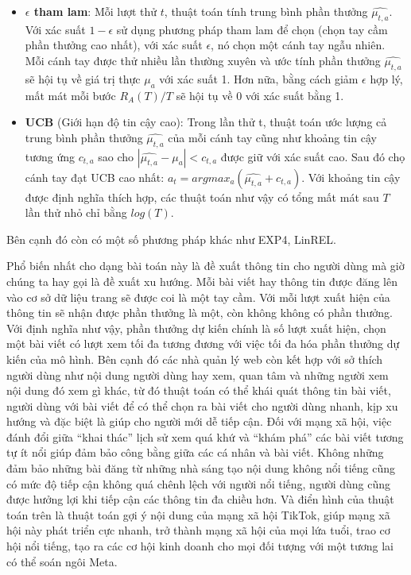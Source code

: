 \documentclass[14pt,oneside]{scrbook}
\providecommand{\tightlist}{\setlength{\itemsep}{\smallskipamount}\setlength{\parskip}{\smallskipamount}}
\begin{document}
\begin{itemize}
\tightlist
\item
  \textbf{\(\epsilon\) tham lam}: Mỗi lượt thử \(t\), thuật toán tính
  trung bình phần thưởng \(\hat{\mu_{t,a}}\). Với xác suất
  \(1-\epsilon\) sử dụng phương pháp tham lam để chọn (chọn tay cầm phần
  thưởng cao nhất), với xác suất \(\epsilon\), nó chọn một cánh tay ngẫu
  nhiên. Mỗi cánh tay được thử nhiều lần thường xuyên và ước tính phần
  thưởng \(\hat{\mu_{t,a}}\) sẽ hội tụ về giá trị thực \(\mu_a\) với xác
  suất 1. Hơn nữa, bằng cách giảm \(\epsilon\) hợp lý, mất mát mỗi bước
  \(R_A(T)/T\) sẽ hội tụ về 0 với xác suất bằng 1.
\item
  \textbf{UCB} (Giới hạn độ tin cậy cao): Trong lần thử t, thuật toán
  ước lượng cả trung bình phần thưởng \(\hat{\mu_{t,a}}\) của mỗi cánh
  tay cũng như khoảng tin cậy tương ứng \(c_{t,a}\) sao cho
  \(|\hat{\mu_{t,a}}-\mu_a|<c_{t,a}\) được giữ với xác suất cao. Sau đó
  chọ cánh tay đạt UCB cao nhất:
  \(a_t= argmax_a(\hat{\mu_{t,a}}+c_{t,a})\). Với khoảng tin cậy được
  định nghĩa thích hợp, các thuật toán như vậy có tổng mất mát sau \(T\)
  lần thử nhỏ chỉ bằng \(log(T)\).
\end{itemize}

Bên cạnh đó còn có một số phương pháp khác như EXP4, LinREL.

Phổ biến nhất cho dạng bài toán này là đề xuất thông tin cho người dùng
mà giờ chúng ta hay gọi là đề xuất xu hướng. Mỗi bài viết hay thông tin
được đăng lên vào cơ sở dữ liệu trang sẽ được coi là một tay cầm. Với
mỗi lượt xuất hiện của thông tin sẽ nhận được phần thưởng là một, còn
không không có phần thưởng. Với định nghĩa như vậy, phần thưởng dự kiến
chính là số lượt xuất hiện, chọn một bài viết có lượt xem tối đa tương
đương với việc tối đa hóa phần thưởng dự kiến của mô hình. Bên cạnh đó
các nhà quản lý web còn kết hợp với sở thích người dùng như nội dung
người dùng hay xem, quan tâm và những người xem nội dung đó xem gì khác,
từ đó thuật toán có thể khái quát thông tin bài viết, người dùng với bài
viết để có thể chọn ra bài viết cho người dùng nhanh, kịp xu hướng và
đặc biệt là giúp cho người mới dễ tiếp cận. Đối với mạng xã hội, việc
đánh đổi giữa ``khai thác'' lịch sử xem quá khứ và ``khám phá'' các bài
viết tương tự ít nổi giúp đảm bảo công bằng giữa các cá nhân và bài
viết. Không những đảm bảo những bài đăng từ những nhà sáng tạo nội dung
không nổi tiếng cũng có mức độ tiếp cận không quá chênh lệch với người
nổi tiếng, người dùng cũng được hưởng lợi khi tiếp cận các thông tin đa
chiều hơn. Và điển hình của thuật toán trên là thuật toán gợi ý nội dung
của mạng xã hội TikTok, giúp mạng xã hội này phát triển cực nhanh, trở
thành mạng xã hội của mọi lứa tuổi, trao cơ hội nổi tiếng, tạo ra các cơ
hội kinh doanh cho mọi đối tượng với một tương lai có thể soán ngôi
Meta.
\end{document}
